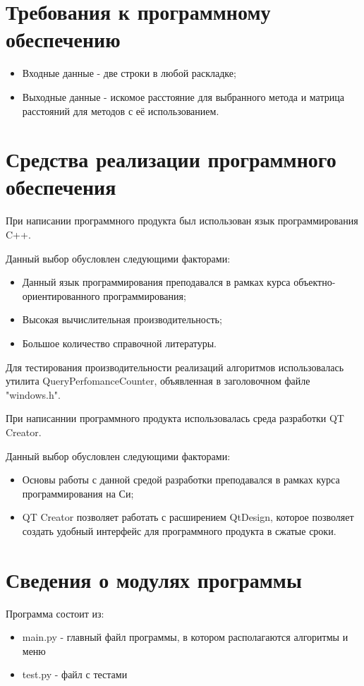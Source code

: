 \documentclass[12pt]{report}
\begin{document}
\section{Требования к программному обеспечению}
\begin{itemize}
\item Входные данные - две строки в любой раскладке;
\item Выходные данные - искомое расстояние для выбранного метода и матрица расстояний для методов с её использованием.
\end{itemize}
\section{Средства реализации программного обеспечения}
При написании программного продукта был использован язык программирования C++.

Данный выбор обусловлен следующими факторами:
\begin{itemize}
\item Данный язык программирования преподавался в рамках курса объектно-ориентированного программирования;
\item Высокая вычислительная производительность;
\item Большое количество справочной литературы.
\end{itemize}

Для тестирования производительности реализаций алгоритмов использовалась утилита QueryPerfomanceCounter, объявленная в заголовочном файле "windows.h".

При написаннии программного продукта использовалась среда разработки QT Creator.

Данный выбор обусловлен следующими факторами:
\begin{itemize}
\item Основы работы с данной средой разработки преподавался в рамках курса программирования на Си;
\item QT Creator позволяет работать с расширением QtDesign, которое позволяет создать удобный интерфейс для программного продукта в сжатые сроки.
\end{itemize}

\section{Сведения о модулях программы}
Программа состоит из:
\begin{itemize}
	\item main.py - главный файл программы, в котором располагаются алгоритмы и меню
	\item test.py - файл с тестами 
\end{itemize}
\end{document}
